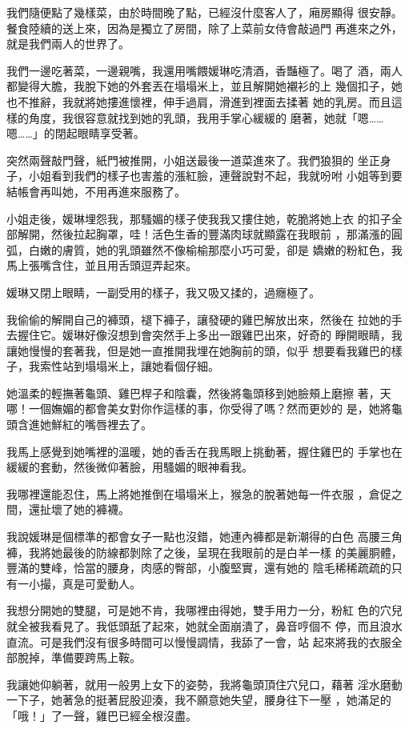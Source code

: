 我們隨便點了幾樣菜，由於時間晚了點，已經沒什麼客人了，廂房顯得
很安靜。餐食陸續的送上來，因為是獨立了房間，除了上菜前女侍會敲過門
再進來之外，就是我們兩人的世界了。

我們一邊吃著菜，一邊親嘴，我還用嘴餵媛琳吃清酒，香豔極了。喝了
酒，兩人都變得大膽，我脫下她的外套丟在塌塌米上，並且解開她襯衫的上
幾個扣子，她也不推辭，我就將她摟進懷裡，伸手過肩，滑進到裡面去揉著
她的乳房。而且這樣的角度，我很容意就找到她的乳頭，我用手掌心緩緩的
磨著，她就「嗯……嗯……」的閉起眼睛享受著。

突然兩聲敲門聲，紙門被推開，小姐送最後一道菜進來了。我們狼狽的
坐正身子，小姐看到我們的樣子也害羞的漲紅臉，連聲說對不起，我就吩咐
小姐等到要結帳會再叫她，不用再進來服務了。

小姐走後，媛琳埋怨我，那騷媚的樣子使我我又摟住她，乾脆將她上衣
的扣子全部解開，然後拉起胸罩，哇！活色生香的豐滿肉球就顯露在我眼前
，那滿漲的圓弧，白嫩的膚質，她的乳頭雖然不像榆榆那麼小巧可愛，卻是
嬌嫩的粉紅色，我馬上張嘴含住，並且用舌頭逗弄起來。

媛琳又閉上眼睛，一副受用的樣子，我又吸又揉的，過癮極了。

我偷偷的解開自己的褲頭，褪下褲子，讓發硬的雞巴解放出來，然後在
拉她的手去握住它。媛琳好像沒想到會突然手上多出一跟雞巴出來，好奇的
睜開眼睛，我讓她慢慢的套著我，但是她一直推開我埋在她胸前的頭，似乎
想要看我雞巴的樣子，我索性站到塌塌米上，讓她看個仔細。

她溫柔的輕撫著龜頭、雞巴桿子和陰囊，然後將龜頭移到她臉頰上磨擦
著，天哪！一個嫵媚的都會美女對你作這樣的事，你受得了嗎？然而更妙的
是，她將龜頭含進她鮮紅的嘴唇裡去了。

我馬上感覺到她嘴裡的溫暖，她的香舌在我馬眼上挑動著，握住雞巴的
手掌也在緩緩的套動，然後微仰著臉，用騷媚的眼神看我。

我哪裡還能忍住，馬上將她推倒在塌塌米上，猴急的脫著她每一件衣服
，倉促之間，還扯壞了她的褲襪。

我說媛琳是個標準的都會女子一點也沒錯，她連內褲都是新潮得的白色
高腰三角褲，我將她最後的防線都剝除了之後，呈現在我眼前的是白羊一樣
的美麗胴體，豐滿的雙峰，恰當的腰身，肉感的臀部，小腹堅實，還有她的
陰毛稀稀疏疏的只有一小撮，真是可愛動人。

我想分開她的雙腿，可是她不肯，我哪裡由得她，雙手用力一分，粉紅
色的穴兒就全被我看見了。我低頭舐了起來，她就全面崩潰了，鼻音哼個不
停，而且浪水直流。可是我們沒有很多時間可以慢慢調情，我舔了一會，站
起來將我的衣服全部脫掉，準備要跨馬上鞍。

我讓她仰躺著，就用一般男上女下的姿勢，我將龜頭頂住穴兒口，藉著
淫水磨動一下子，她著急的挺著屁股迎湊，我不願意她失望，腰身往下一壓
，她滿足的「哦！」了一聲，雞巴已經全根沒盡。

